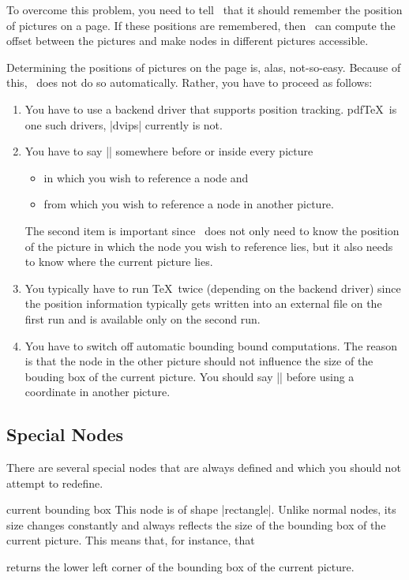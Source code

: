 To overcome this problem, you need to tell \pgfname\ that it should
remember the position of pictures on a page. If these positions are
remembered, then \pgfname\ can compute the offset between the pictures
and make nodes in different pictures accessible.

Determining the positions of pictures on the page is, alas,
not-so-easy. Because of this, \pgfname\ does not do so
automatically. Rather, you have to proceed as follows:
\begin{enumerate}
\item You have to use a backend driver that supports position
  tracking. pdf\TeX\ is one such drivers, |dvips| currently is not.
\item You have to say |\pgfrememberpicturepositiononpagetrue|
  somewhere before or inside every picture
  \begin{itemize}
  \item in which you wish to reference a node and
  \item from which you wish to reference a node in another picture.
  \end{itemize}
  The second item is important since \pgfname\ does not only need to
  know the position of the picture in which the node you wish to
  reference lies, but it also needs to know where the current picture
  lies.
\item You typically have to run \TeX\ twice (depending on the backend
  driver) since the position information typically gets written into
  an external file on the first run and is available only on the
  second run.
\item You have to switch off automatic bounding bound
  computations. The reason is that the node in the other picture
  should not influence the size of the bouding box of the current
  picture. You should say || before
  using a coordinate in another picture.
\end{enumerate}



\subsection{Special Nodes}

There are several special nodes that are always defined and which you
should not attempt to redefine.

\begin{predefinednode}{current bounding box}
  This node is of shape |rectangle|. Unlike normal nodes, its size
  changes constantly and always reflects the size of the bounding box
  of the current picture. This means that, for instance, that
\begin{codeexample}
\end{codeexample}
  returns the lower left corner of the bounding box of the current
  picture. 
\end{predefinednode}

